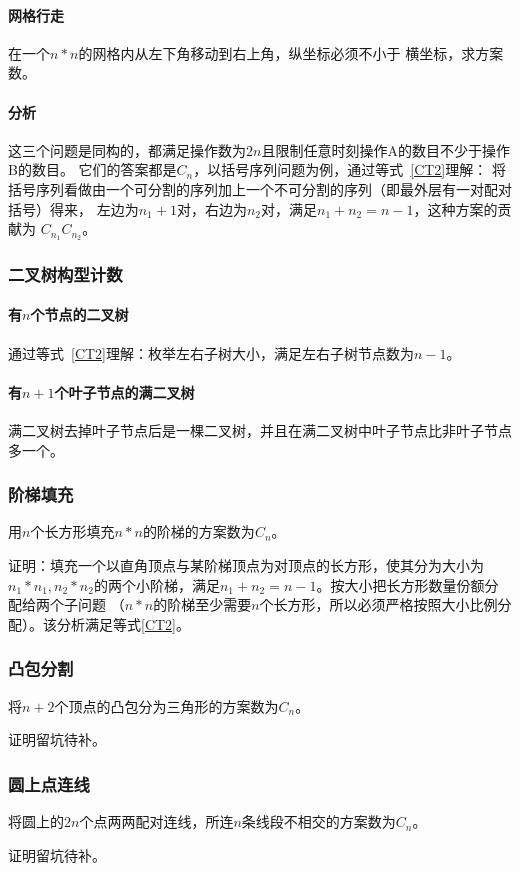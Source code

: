 \paragraph{网格行走} 在一个$n*n$的网格内从左下角移动到右上角，纵坐标必须不小于
横坐标，求方案数。
\paragraph{分析}
这三个问题是同构的，都满足操作数为$2n$且限制任意时刻操作A的数目不少于操作B的数目。
它们的答案都是$C_n$，以括号序列问题为例，通过等式~\ref{CT2}理解：
将括号序列看做由一个可分割的序列加上一个不可分割的序列（即最外层有一对配对括号）得来，
左边为$n_1+1$对，右边为$n_2$对，满足$n_1+n_2=n-1$，这种方案的贡献为
$C_{n_1}C_{n_2}$。
\subsubsection{二叉树构型计数}
\paragraph{有$n$个节点的二叉树}
通过等式~\ref{CT2}理解：枚举左右子树大小，满足左右子树节点数为$n-1$。
\paragraph{有$n+1$个叶子节点的满二叉树}
满二叉树去掉叶子节点后是一棵二叉树，并且在满二叉树中叶子节点比非叶子节点多一个。
\subsubsection{阶梯填充}
用$n$个长方形填充$n*n$的阶梯的方案数为$C_n$。

证明：填充一个以直角顶点与某阶梯顶点为对顶点的长方形，使其分为大小为
$n_1*n_1,n_2*n_2$的两个小阶梯，满足$n_1+n_2=n-1$。按大小把长方形数量份额分配给两个子问题
（$n*n$的阶梯至少需要$n$个长方形，所以必须严格按照大小比例分配）。该分析满足等式\ref{CT2}。
\subsubsection{凸包分割}
将$n+2$个顶点的凸包分为三角形的方案数为$C_n$。

证明留坑待补。
\subsubsection{圆上点连线}
将圆上的$2n$个点两两配对连线，所连$n$条线段不相交的方案数为$C_n$。

证明留坑待补。

